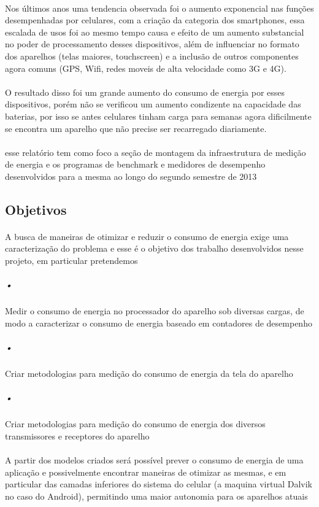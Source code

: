 \documentclass[11pt,a4paper,titlepage]{article}
\begin{document}
\paragraph{} Nos últimos anos uma tendencia observada foi o aumento exponencial nas funções desempenhadas por celulares, com a criação da categoria dos smartphones, essa escalada de usos foi ao mesmo tempo causa e efeito de um aumento substancial no poder de processamento desses dispositivos, além de influenciar no formato dos aparelhos (telas maiores, touchscreen) e a inclusão de outros componentes agora comuns (GPS, Wifi, redes moveis de alta velocidade como 3G e 4G).
\paragraph{} O resultado disso foi um grande aumento do consumo de energia por esses dispositivos, porém não se verificou um aumento condizente na capacidade das baterias, por isso se antes celulares tinham carga para semanas agora dificilmente se encontra um aparelho que não precise ser recarregado diariamente.
\paragraph{} esse relatório tem como foco a seção de montagem da infraestrutura de medição de energia e os programas de benchmark e medidores de desempenho desenvolvidos para a mesma ao longo do segundo semestre de 2013
\subsection{Objetivos}
\paragraph{} A busca de maneiras de otimizar e reduzir o consumo de energia exige uma caracterização do problema e esse é o objetivo dos trabalho desenvolvidos nesse projeto, em particular pretendemos 
\subparagraph{•} Medir o consumo de energia no processador do aparelho sob diversas cargas, de modo a caracterizar o consumo de energia baseado em contadores de desempenho
\subparagraph{•} Criar metodologias para medição do consumo de energia da tela do aparelho
\subparagraph{•} Criar metodologias para medição do consumo de energia dos diversos transmissores e receptores do aparelho  
\paragraph{} A partir dos modelos criados será possível prever o consumo de energia de uma aplicação e possivelmente encontrar maneiras de otimizar as mesmas, e em particular das camadas inferiores do sistema do celular (a maquina virtual Dalvik no caso do Android), permitindo uma maior autonomia para os aparelhos atuais
\end{document}
